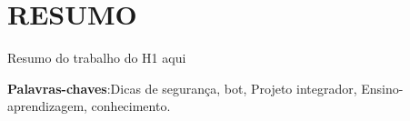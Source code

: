 \noindent\chapter*{\uppercase{Resumo}}

Resumo do trabalho do H1 aqui
  
\vspace{1cm}

\noindent \textbf{Palavras-chaves}:Dicas de segurança, bot, Projeto integrador, Ensino-aprendizagem, conhecimento.
